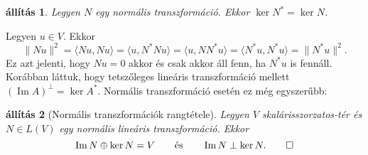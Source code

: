 \documentclass[a4paper, showtrims]{memoir}
\makeatletter
\renewenvironment{proof}[1][\proofname]
    {\par\pushQED{\qed}%
    \normalfont \topsep6\p@\@plus6\p@\relax
    \trivlist
    \item[\hskip\labelsep
        \itshape
    #1\@addpunct{:}]\ignorespaces}
    {\popQED\endtrivlist\@endpefalse}
\theoremstyle{plain}
\newtheorem{proposition}{állítás}[chapter]
\theoremstyle{remark}
\theoremstyle{definition}
\DeclareMathOperator{\im}{Im}
\newcommand{\ip}[2]{\langle#1,#2\rangle}
\makeatother
\begin{document}
\begin{proposition}
	Legyen $N$ egy normális transzformáció.
	Ekkor $\ker N^\ast=\ker N$.
\end{proposition}
\begin{proof}
	Legyen $u\in V.$
	Ekkor
	\[
		\|Nu\|^2
		=
		\ip{Nu}{Nu}
		=
		\ip{u}{N^\ast Nu}
		=
		\ip{u}{NN^\ast u}
		=
		\ip{N^\ast u}{N^\ast u}
		=
		\|N^\ast u\|^2.
	\]
	Ez azt jelenti, hogy $Nu=0$ akkor és csak akkor áll fenn,
	ha $N^\ast u$ is fennáll.
\end{proof}
Korábban láttuk,
hogy tetszőleges lineáris transzformáció mellett $(\im A)^\perp=\ker A^\ast.$
Normális transzformáció esetén ez még egyszerűbb:
\begin{proposition}[Normális transzformációk rangtétele]\label{pr:normalisrang}
	Legyen $V$ skalárisszorzatos-tér és $N\in L\left( V \right)$ egy normális lineáris transzformáció.
	Ekkor
	\[
		\im N\oplus\ker N=V\qquad\text{és}\qquad \im N\perp \ker N.
		\qedhere
	\]
\end{proposition}
\end{document}
